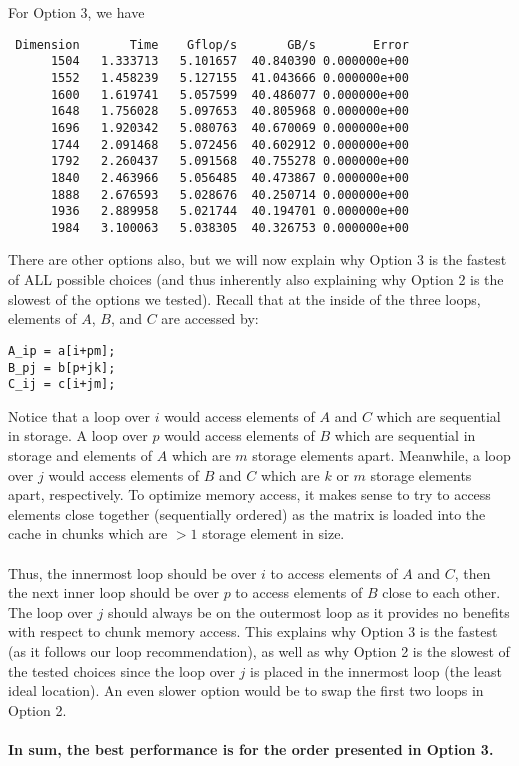 \documentclass[10pt, letterpaper]{article}
\begin{document}
For Option 3, we have
\begin{verbatim}
 Dimension       Time    Gflop/s       GB/s        Error
      1504   1.333713   5.101657  40.840390 0.000000e+00
      1552   1.458239   5.127155  41.043666 0.000000e+00
      1600   1.619741   5.057599  40.486077 0.000000e+00
      1648   1.756028   5.097653  40.805968 0.000000e+00
      1696   1.920342   5.080763  40.670069 0.000000e+00
      1744   2.091468   5.072456  40.602912 0.000000e+00
      1792   2.260437   5.091568  40.755278 0.000000e+00
      1840   2.463966   5.056485  40.473867 0.000000e+00
      1888   2.676593   5.028676  40.250714 0.000000e+00
      1936   2.889958   5.021744  40.194701 0.000000e+00
      1984   3.100063   5.038305  40.326753 0.000000e+00
\end{verbatim}
There are other options also, but we will now explain why Option 3 is the fastest of ALL possible choices (and thus inherently also explaining why Option 2 is the slowest of the options we tested). Recall that at the inside of the three loops, elements of $A$, $B$, and $C$ are accessed by:
\begin{verbatim}
A_ip = a[i+pm];
B_pj = b[p+jk];
C_ij = c[i+jm];
\end{verbatim}
Notice that a loop over $i$ would access elements of $A$ and $C$ which are sequential in storage. A loop over $p$ would access elements of $B$ which are sequential in storage and elements of $A$ which are $m$ storage elements apart. Meanwhile, a loop over $j$ would access elements of $B$ and $C$ which are $k$ or $m$ storage elements apart, respectively. To optimize memory access, it makes sense to try to access elements close together (sequentially ordered) as the matrix is loaded into the cache in chunks which are $>1$ storage element in size.\\\\
Thus, the innermost loop should be over $i$ to access elements of $A$ and $C$, then the next inner loop should be over $p$ to access elements of $B$ close to each other. The loop over $j$ should always be on the outermost loop as it provides no benefits with respect to chunk memory access. This explains why Option 3 is the fastest (as it follows our loop recommendation), as well as why Option 2 is the slowest of the tested choices since the loop over $j$ is placed in the innermost loop (the least ideal location). An even slower option would be to swap the first two loops in Option 2.\\\\
\textbf{In sum, the best performance is for the order presented in Option 3.}
\end{document}
